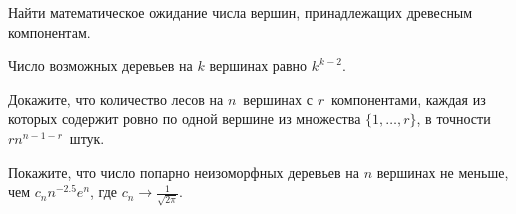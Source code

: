 \begin{problem}
Найти математическое ожидание числа вершин, принадлежащих древесным компонентам.
\begin{ordre}
Число возможных деревьев на $k$ вершинах равно $k^{k-2}$. 
\end{ordre}
\end{problem}

\begin{problem}
Докажите, что количество лесов на $n$~вершинах с $r$~компонентами, каждая из которых содержит ровно по одной вершине из множества $ \{1, \ldots, r\} $, в точности $rn^{n-1-r}$~штук.
\end{problem}

\begin{problem}
Покажите, что число попарно неизоморфных деревьев на $n$ вершинах не меньше, чем $ c_n n^{-2.5} e^n $, где $ c_n \to \frac{1}{\sqrt{2\pi}}$.
\end{problem}

